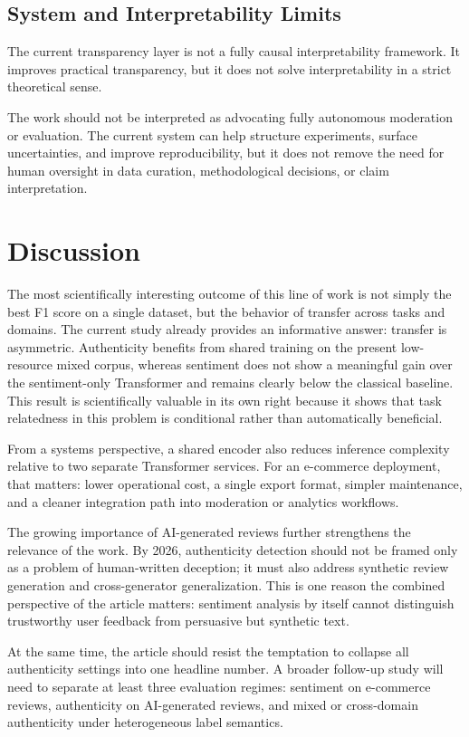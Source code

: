 \documentclass[12pt,a4paper]{article}
\begin{document}
\subsection{System and Interpretability Limits}

The current transparency layer is not a fully causal interpretability framework. It improves practical transparency, but it does not solve interpretability in a strict theoretical sense.

The work should not be interpreted as advocating fully autonomous moderation or evaluation. The current system can help structure experiments, surface uncertainties, and improve reproducibility, but it does not remove the need for human oversight in data curation, methodological decisions, or claim interpretation.

\section{Discussion}

The most scientifically interesting outcome of this line of work is not simply the best F1 score on a single dataset, but the behavior of transfer across tasks and domains. The current study already provides an informative answer: transfer is asymmetric. Authenticity benefits from shared training on the present low-resource mixed corpus, whereas sentiment does not show a meaningful gain over the sentiment-only Transformer and remains clearly below the classical baseline. This result is scientifically valuable in its own right because it shows that task relatedness in this problem is conditional rather than automatically beneficial.

From a systems perspective, a shared encoder also reduces inference complexity relative to two separate Transformer services. For an e-commerce deployment, that matters: lower operational cost, a single export format, simpler maintenance, and a cleaner integration path into moderation or analytics workflows.

The growing importance of AI-generated reviews further strengthens the relevance of the work. By 2026, authenticity detection should not be framed only as a problem of human-written deception; it must also address synthetic review generation and cross-generator generalization. This is one reason the combined perspective of the article matters: sentiment analysis by itself cannot distinguish trustworthy user feedback from persuasive but synthetic text.

At the same time, the article should resist the temptation to collapse all authenticity settings into one headline number. A broader follow-up study will need to separate at least three evaluation regimes: sentiment on e-commerce reviews, authenticity on AI-generated reviews, and mixed or cross-domain authenticity under heterogeneous label semantics.
\end{document}

